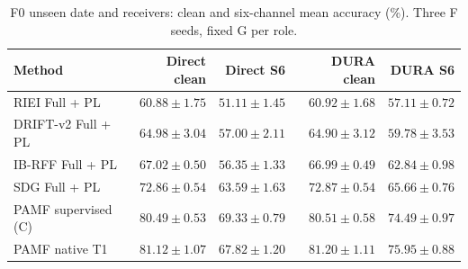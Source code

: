 \begin{table}[t]\centering\small
\setlength{\tabcolsep}{5pt}\renewcommand{\arraystretch}{1.15}
\caption{F0 unseen date and receivers: clean and six-channel mean accuracy (\%). Three F seeds, fixed G per role.}
\begin{tabular*}{\textwidth}{@{\extracolsep{\fill}}lrrrr@{}}\toprule
Method & Direct clean & Direct S6 & DURA clean & DURA S6\\\midrule
RIEI Full + PL & $60.88\pm1.75$ & $51.11\pm1.45$ & $60.92\pm1.68$ & $57.11\pm0.72$\\
DRIFT-v2 Full + PL & $64.98\pm3.04$ & $57.00\pm2.11$ & $64.90\pm3.12$ & $59.78\pm3.53$\\
IB-RFF Full + PL & $67.02\pm0.50$ & $56.35\pm1.33$ & $66.99\pm0.49$ & $62.84\pm0.98$\\
SDG Full + PL & $72.86\pm0.54$ & $63.59\pm1.63$ & $72.87\pm0.54$ & $65.66\pm0.76$\\
PAMF supervised (C) & $80.49\pm0.53$ & $69.33\pm0.79$ & $80.51\pm0.58$ & $74.49\pm0.97$\\
PAMF native T1 & $81.12\pm1.07$ & $67.82\pm1.20$ & $81.20\pm1.11$ & $75.95\pm0.88$\\
\bottomrule\end{tabular*}\end{table}
